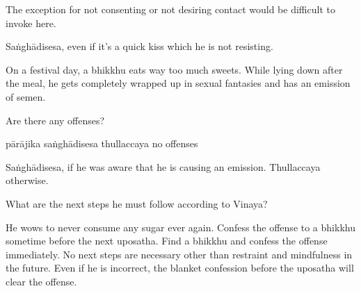 \begin{exam}{\autoExamName}
\begin{problem}
  \begin{solution}
    The exception for not consenting or not desiring contact would be difficult to invoke here.

    Saṅghādisesa, even if it's a quick kiss which he is not resisting.
  \end{solution}

\end{problem}

\problemDivide

\begin{problem*}

  On a festival day, a bhikkhu eats way too much sweets.
  While lying down after the meal, he gets completely wrapped up in sexual fantasies and has an emission of semen.

  \bigskip

  \begin{parts}

  \item Are there any offenses?

  \bigskip

  \begin{answers}{4}
    \bChoices
     pārājika\eAns
     saṅghādisesa\eAns
     thullaccaya\eAns
     no offenses\eAns
    \eChoices
  \end{answers}

  \begin{solution}
    Saṅghādisesa, if he was aware that he is causing an emission. Thullaccaya otherwise.
  \end{solution}

  \bigskip

  \item What are the next steps he must follow according to Vinaya?

  \bigskip

  \begin{manswers}{1}
    \bChoices
     He wows to never consume any sugar ever again.\eAns
     Confess the offense to a bhikkhu sometime before the next uposatha.\eAns
     Find a bhikkhu and confess the offense immediately.\eAns
     No next steps are necessary other than restraint and mindfulness in the future. Even if he is incorrect, the blanket confession before the uposatha will clear the offense.\eAns
    \eChoices
  \end{manswers}

  \end{parts}


\end{problem*}
\end{exam}
